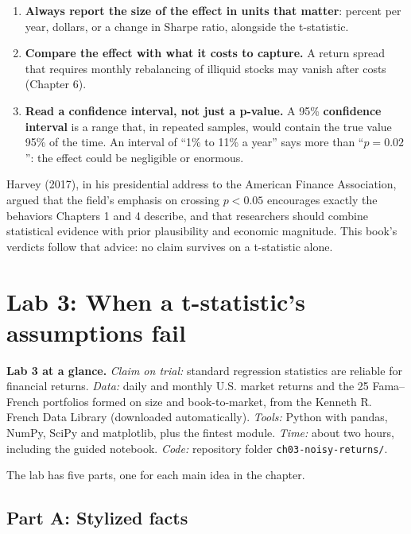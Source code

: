 \begin{enumerate}
  \item \textbf{Always report the size of the effect in units that matter}: percent per year, dollars, or a change in Sharpe ratio, alongside the t-statistic.
  \item \textbf{Compare the effect with what it costs to capture.} A return spread that requires monthly rebalancing of illiquid stocks may vanish after costs (Chapter 6).
  \item \textbf{Read a confidence interval, not just a p-value.} A 95\% \textbf{confidence interval} is a range that, in repeated samples, would contain the true value 95\% of the time. An interval of ``1\% to 11\% a year'' says more than ``$p = 0.02$'': the effect could be negligible or enormous.
\end{enumerate}

Harvey (2017), in his presidential address to the American Finance Association, argued that the field's emphasis on crossing $p < 0.05$ encourages exactly the behaviors Chapters 1 and 4 describe, and that researchers should combine statistical evidence with prior plausibility and economic magnitude. This book's verdicts follow that advice: no claim survives on a t-statistic alone.

\section{Lab 3: When a t-statistic's assumptions fail}
\label{sec:03-lab}

\begin{callout}
\textbf{Lab 3 at a glance.} \emph{Claim on trial:} standard regression statistics are reliable for financial returns. \emph{Data:} daily and monthly U.S. market returns and the 25 Fama--French portfolios formed on size and book-to-market, from the Kenneth R. French Data Library (downloaded automatically). \emph{Tools:} Python with pandas, NumPy, SciPy and matplotlib, plus the fintest module. \emph{Time:} about two hours, including the guided notebook. \emph{Code:} repository folder \texttt{ch03-noisy-returns/}.
\end{callout}

The lab has five parts, one for each main idea in the chapter.

\subsection*{Part A: Stylized facts}

